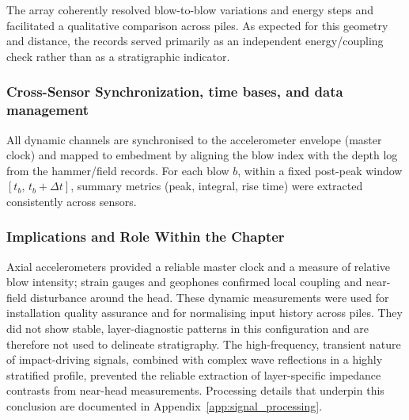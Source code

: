 {{{{The array coherently resolved blow-to-blow variations and energy steps and facilitated a qualitative comparison across piles.
As expected for this geometry and distance, the records served primarily as an independent energy/coupling check rather than as a stratigraphic indicator.

\subsubsection{Cross-Sensor Synchronization, time bases, and data management}
\label{sec:sync_depthtime}
All dynamic channels are synchronised to the accelerometer envelope (master clock) and mapped to embedment by aligning the blow index with the depth log from the hammer/field records.
For each blow $b$, within a fixed post-peak window $[t_b,\,t_b+\Delta t]$, summary metrics (peak, integral, rise time) were extracted consistently across sensors.



\subsubsection{Implications and Role Within the Chapter}
\label{sec:dynamic_implications}

Axial accelerometers provided a reliable master clock and a measure of relative blow intensity; strain gauges and geophones confirmed local coupling and near-field disturbance around the head. These dynamic measurements were used for installation quality assurance and for normalising input history across piles. They did not show stable, layer-diagnostic patterns in this configuration and are therefore not used to delineate stratigraphy. The high-frequency, transient nature of impact-driving signals, combined with complex wave reflections in a highly stratified profile, prevented the reliable extraction of layer-specific impedance contrasts from near-head measurements. Processing details that underpin this conclusion are documented in Appendix~\ref{app:signal_processing}.


}}}}
